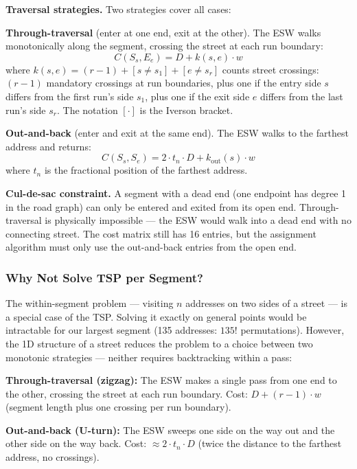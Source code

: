 \documentclass[conference]{IEEEtran}
\begin{document}
\textbf{Traversal strategies.} Two strategies cover all cases:

\textbf{Through-traversal} (enter at one end, exit at the other). The ESW walks monotonically along the segment, crossing the street at each run boundary:
\begin{equation}
C(S_s, E_e) = D + k(s,e) \cdot w
\label{eq:through}
\end{equation}
where $k(s,e) = (r{-}1) + [s \neq s_1] + [e \neq s_r]$ counts street crossings: $(r{-}1)$ mandatory crossings at run boundaries, plus one if the entry side $s$ differs from the first run's side $s_1$, plus one if the exit side $e$ differs from the last run's side $s_r$. The notation $[\cdot]$ is the Iverson bracket.

\textbf{Out-and-back} (enter and exit at the same end). The ESW walks to the farthest address and returns:
\begin{equation}
C(S_s, S_e) = 2 \cdot t_n \cdot D + k_{\text{out}}(s) \cdot w
\label{eq:outback}
\end{equation}
where $t_n$ is the fractional position of the farthest address.

\textbf{Cul-de-sac constraint.} A segment with a dead end (one endpoint has degree 1 in the road graph) can only be entered and exited from its open end. Through-traversal is physically impossible --- the ESW would walk into a dead end with no connecting street. The cost matrix still has 16 entries, but the assignment algorithm must only use the out-and-back entries from the open end.

\subsubsection{Why Not Solve TSP per Segment?}

The within-segment problem --- visiting $n$ addresses on two sides of a street --- is a special case of the TSP. Solving it exactly on general points would be intractable for our largest segment (135 addresses: $135!$ permutations). However, the 1D structure of a street reduces the problem to a choice between two monotonic strategies --- neither requires backtracking within a pass:

\textbf{Through-traversal (zigzag):} The ESW makes a single pass from one end to the other, crossing the street at each run boundary. Cost: $D + (r{-}1) \cdot w$ (segment length plus one crossing per run boundary).

\textbf{Out-and-back (U-turn):} The ESW sweeps one side on the way out and the other side on the way back. Cost: $\approx 2 \cdot t_n \cdot D$ (twice the distance to the farthest address, no crossings).
\end{document}
